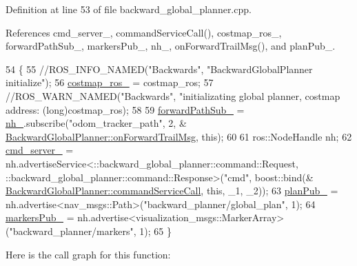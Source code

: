Definition at line 53 of file backward\+\_\+global\+\_\+planner.\+cpp.



References cmd\+\_\+server\+\_\+, command\+Service\+Call(), costmap\+\_\+ros\+\_\+, forward\+Path\+Sub\+\_\+, markers\+Pub\+\_\+, nh\+\_\+, on\+Forward\+Trail\+Msg(), and plan\+Pub\+\_\+.


\begin{DoxyCode}
54 \{
55     \textcolor{comment}{//ROS\_INFO\_NAMED("Backwards", "BackwardGlobalPlanner initialize");}
56     \hyperlink{classmove__base__z__client_1_1backward__global__planner_1_1BackwardGlobalPlanner_ae8c01babf5da5df079840246c34ef1ea}{costmap\_ros\_} = costmap\_ros;
57     \textcolor{comment}{//ROS\_WARN\_NAMED("Backwards", "initializating global planner, costmap address: %
       (long)costmap\_ros);}
58 
59     \hyperlink{classmove__base__z__client_1_1backward__global__planner_1_1BackwardGlobalPlanner_aa30061ee4e43cac7513fb253ccedd077}{forwardPathSub\_} = \hyperlink{classmove__base__z__client_1_1backward__global__planner_1_1BackwardGlobalPlanner_acc560c431ab390c2c32ba27fdbec95e6}{nh\_}.subscribe(\textcolor{stringliteral}{"odom\_tracker\_path"}, 2, &
      \hyperlink{classmove__base__z__client_1_1backward__global__planner_1_1BackwardGlobalPlanner_a21ba5e6dbe063eb3ea1a34d8cccf90a3}{BackwardGlobalPlanner::onForwardTrailMsg}, \textcolor{keyword}{this});
60 
61     ros::NodeHandle nh;
62     \hyperlink{classmove__base__z__client_1_1backward__global__planner_1_1BackwardGlobalPlanner_a470ef57fa2c4caf288ef4ba2934f44e2}{cmd\_server\_} = nh.advertiseService<::backward\_global\_planner::command::Request, 
      ::backward\_global\_planner::command::Response>(\textcolor{stringliteral}{"cmd"}, boost::bind(&
      \hyperlink{classmove__base__z__client_1_1backward__global__planner_1_1BackwardGlobalPlanner_a089a3f34a80d7c6540bdf771eaf409f5}{BackwardGlobalPlanner::commandServiceCall}, \textcolor{keyword}{this}, \_1, \_2));
63     \hyperlink{classmove__base__z__client_1_1backward__global__planner_1_1BackwardGlobalPlanner_ab074d9ac8ea790d7f5275ee27dae940c}{planPub\_} = nh.advertise<nav\_msgs::Path>(\textcolor{stringliteral}{"backward\_planner/global\_plan"}, 1);
64     \hyperlink{classmove__base__z__client_1_1backward__global__planner_1_1BackwardGlobalPlanner_a52a247da9267a83e51679d41e09f11a4}{markersPub\_} = nh.advertise<visualization\_msgs::MarkerArray>(\textcolor{stringliteral}{"backward\_planner/markers"}, 1);
65 \}
\end{DoxyCode}
Here is the call graph for this function\+:
\nopagebreak
